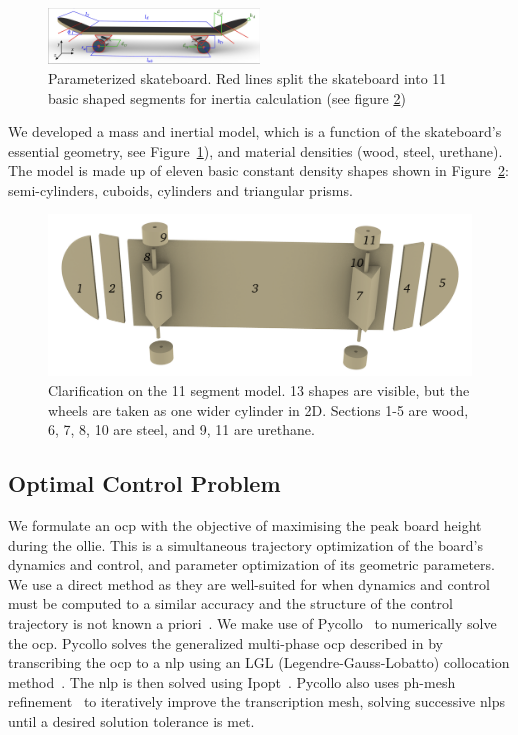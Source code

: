 \documentclass[default,iicol]{sn-jnl}
\begin{document}
\begin{figure}
  \centerline{
    \includegraphics[width=0.5\textwidth,trim={0.1cm 0.1cm 0.1cm 0.05cm},clip]{figure/parameterized.png}
  }
  \caption[11-Segment skateboard model]{Parameterized skateboard. Red lines
    split the skateboard into 11 basic shaped segments for inertia calculation
    (see figure \ref{f_basicshapes})}
\label{f_11segments}
\end{figure}

We developed a mass and inertial model, which is a function of the skateboard's essential geometry, see Figure~\ref{f_11segments}), and material densities (wood, steel, urethane). The model is made up of eleven basic constant density shapes shown in Figure~\ref{f_basicshapes}: semi-cylinders, cuboids, cylinders and triangular prisms.
%
\begin{figure}
  \centering
  \includegraphics[width = 0.5 \textwidth]{figure/Basicshapes.png}
  \caption[Exploded 11 segment model]{Clarification on the 11 segment model.
    13 shapes are visible, but the wheels are taken as one wider cylinder in
    2D. Sections 1-5 are wood, 6, 7, 8, 10 are steel, and 9, 11 are urethane.}
  \label{f_basicshapes}
\end{figure}

\subsection{Optimal Control Problem}
We formulate an \gls{ocp} with the objective of maximising the peak board height during the ollie. This is a simultaneous trajectory optimization of the board's dynamics and control, and parameter optimization of its geometric parameters. We use a direct method as they are well-suited for when dynamics and control must be computed to a similar accuracy and the structure of the control trajectory is not known a priori~\cite{kelly_introduction_2017}. We make use of Pycollo~\cite{brockie_2021_predictive} to numerically solve the \gls{ocp}. Pycollo solves the generalized multi-phase \gls{ocp} described in \cite{betts_2010_practical} by transcribing the \gls{ocp} to a \gls{nlp} using an LGL (Legendre-Gauss-Lobatto) collocation method~\cite{betts_2016_using}. The \gls{nlp} is then solved using Ipopt~\cite{biegler_2009_large}. Pycollo also uses ph-mesh refinement~\cite{patterson_2015_ph} to iteratively improve the transcription mesh, solving successive \glspl{nlp} until a desired solution tolerance is met.
\end{document}
